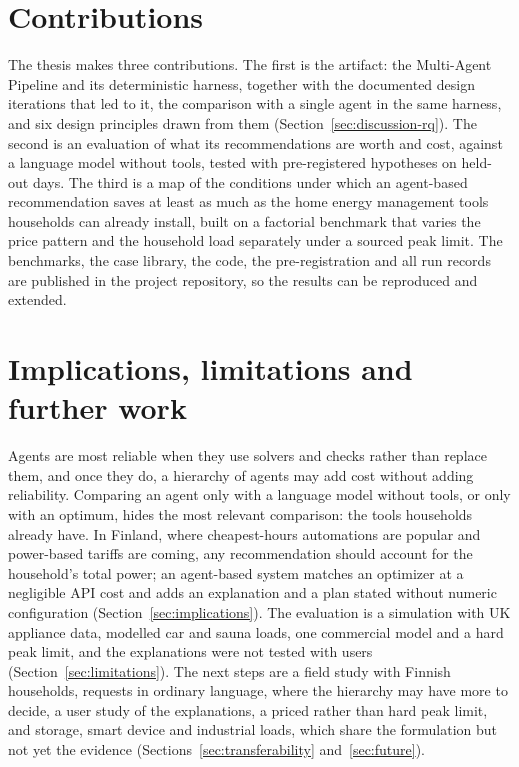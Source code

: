 \documentclass[12pt,a4paper]{report}
\begin{document}
\section{Contributions}

The thesis makes three contributions. The first is the artifact: the
Multi-Agent Pipeline and its deterministic harness, together with the
documented design iterations that led to it, the comparison with a
single agent in the same harness, and six design principles drawn from
them (Section~\ref{sec:discussion-rq}). The second is an evaluation of
what its recommendations are worth and cost, against a language model
without tools, tested with pre-registered hypotheses on held-out days.
The third is a map of the conditions under which an agent-based
recommendation saves at least as much as the home energy
management tools households can already install, built on a factorial
benchmark that varies the price pattern and the household load
separately under a sourced peak limit. The benchmarks, the case
library, the code, the pre-registration and all run records are
published in the project repository, so the results can be reproduced
and extended.

\section{Implications, limitations and further work}

Agents are most reliable when they use solvers and checks rather than
replace them, and once they do, a hierarchy of agents may add cost
without adding reliability. Comparing an agent only with a language
model without tools, or only with an optimum, hides the most relevant
comparison: the tools households already have. In Finland, where
cheapest-hours automations are popular and power-based tariffs are
coming, any recommendation should account for the household's total
power; an agent-based system matches an optimizer at a negligible API
cost and adds an explanation and a plan stated without numeric
configuration (Section~\ref{sec:implications}). The evaluation is a
simulation with UK appliance data, modelled car and sauna loads, one
commercial model and a hard peak limit, and the explanations were not
tested with users (Section~\ref{sec:limitations}). The next steps are a
field study with Finnish households, requests in ordinary language,
where the hierarchy may have more to decide, a user study of the
explanations, a priced rather than hard peak limit, and storage, smart
device and industrial loads, which share the formulation but not yet the
evidence (Sections~\ref{sec:transferability} and~\ref{sec:future}).
\end{document}
